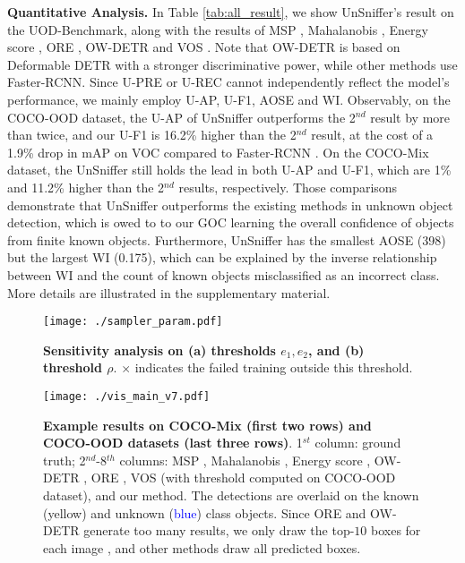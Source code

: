 \documentclass[10pt,twocolumn,letterpaper]{article}
\newcommand{\xf}[1]{{\color{black} #1}}
\newcommand{\net}{UnSniffer\xspace}
\begin{document}
\noindent\textbf{Quantitative Analysis.}
In Table \ref{tab:all_result},
we show \net's result on the UOD-Benchmark,
along with the results of MSP \cite{hendrycks2016baseline}, Mahalanobis \cite{denouden2018improving}, Energy score \cite{liu2020energy}, ORE \cite{owod}, OW-DETR \cite{OWDETR} and VOS \cite{vos}.
Note that OW-DETR is based on Deformable DETR \cite{zhu2020deformable} with a stronger discriminative power,
while other methods use Faster-RCNN.
Since U-PRE or U-REC cannot independently reflect the model's performance,
we mainly employ U-AP, U-F1, AOSE and WI.
Observably,
on the COCO-OOD dataset, the U-AP of UnSniffer outperforms the 2$^{nd}$ result by more than twice, and our U-F1 is 16.2\% higher than the 2$^{nd}$ result,
at the cost of a 1.9\% drop in mAP on VOC compared to Faster-RCNN \cite{ren2015faster}.
On the COCO-Mix dataset,
the UnSniffer still holds the lead in both U-AP and U-F1,
which are 1\% and 11.2\% higher than the 2$^{nd}$ results, respectively.
Those comparisons demonstrate that UnSniffer outperforms the existing methods in unknown object detection,
which \xf{is owed to} to our GOC learning the overall confidence of objects from finite known objects.
Furthermore, UnSniffer has the smallest AOSE (398) but the largest WI (0.175),
which can be explained by the inverse relationship between WI and the count of known objects misclassified as an incorrect class.
More details are illustrated in the supplementary material.



\begin{figure}
\centering
\texttt{[image: ./sampler\_param.pdf]}
\vspace{-2em}
\caption{
\textbf{Sensitivity analysis on (a) thresholds $e_1, e_2$, and (b) threshold $\rho$}.
$\times$ indicates the failed training outside this threshold.
}
\vspace{-0.6em}
\label{fig:samplingandstrategies}
\end{figure}

\begin{figure*}[t!]
\centering
\texttt{[image: ./vis\_main\_v7.pdf]}
\vspace{-1.5em}
\caption{\textbf{Example results on COCO-Mix (first two rows) and COCO-OOD datasets (last three rows)}.
1$^{st}$ column: ground truth;
2$^{nd}$-8$^{th}$ columns:
MSP \cite{hendrycks2016baseline}, Mahalanobis \cite{denouden2018improving}, Energy score \cite{liu2020energy}, OW-DETR \cite{OWDETR}, ORE \cite{owod}, VOS \cite{vos} (with threshold computed on COCO-OOD dataset), and our method.
The detections are overlaid on the known (\textcolor{yellow2}{yellow}) and unknown (\textcolor{blue}{blue}) class objects.
Since ORE and OW-DETR generate too many results,
we only draw the top-$10$ boxes for each image \xf{, and} other methods draw all predicted boxes.}
\label{fig:Qualitative}
\vspace{-1.1em}
\end{figure*}
\end{document}
